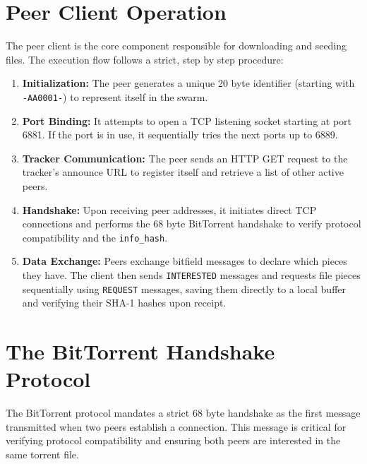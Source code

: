 \documentclass[a4paper,12pt]{article}
\begin{document}
\section{Peer Client Operation}
The peer client is the core component responsible for downloading and seeding files. 
The execution flow follows a strict, step by step procedure:
\begin{enumerate}
    \item \textbf{Initialization:} The peer generates a unique 20 byte identifier (starting with \texttt{-AA0001-}) 
    to represent itself in the swarm.
    \item \textbf{Port Binding:} It attempts to open a TCP listening socket starting at port 6881. If the port is in use, it sequentially tries the next ports up to 6889.
    \item \textbf{Tracker Communication:} The peer sends an HTTP GET request to the tracker's announce URL to register itself and retrieve a list of other active peers.
    \item \textbf{Handshake:} Upon receiving peer addresses, it initiates direct TCP connections and performs the 68 byte BitTorrent handshake to verify protocol compatibility and the \texttt{info\_hash}.
    \item \textbf{Data Exchange:} Peers exchange bitfield messages to declare which pieces they have. The client then sends \texttt{INTERESTED} messages and requests file pieces sequentially using \texttt{REQUEST} messages, 
    saving them directly to a local buffer and verifying their SHA-1 hashes upon receipt.
\end{enumerate}

\section*{The BitTorrent Handshake Protocol}

The BitTorrent protocol mandates a strict 68 byte handshake as the first message transmitted when two peers establish a connection. This message is critical for verifying protocol compatibility and ensuring both peers are interested 
in the same torrent file.
\end{document}

